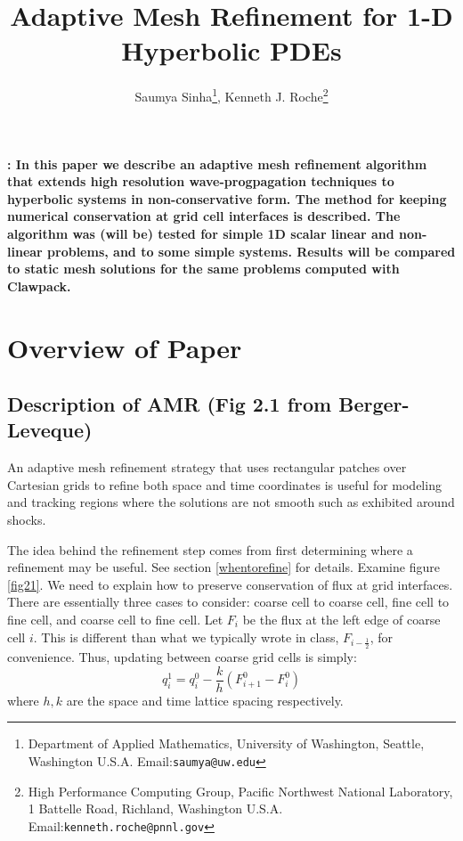 \documentclass[12pt,leqno]{article}
\begin{document}
\title{\bf Adaptive Mesh Refinement for 1-D Hyperbolic PDEs}
\author{ 
Saumya Sinha\footnote{Department of Applied Mathematics, University of Washington, Seattle, Washington
U.S.A.
Email:\texttt{saumya@uw.edu}},
Kenneth J. Roche\footnote{
High Performance Computing Group, 
Pacific Northwest National Laboratory,
1 Battelle Road,
Richland, Washington 
U.S.A. 
Email:\texttt{kenneth.roche@pnnl.gov}} 
}
\maketitle


{\bf \abstractname{: In this paper we describe an adaptive mesh refinement algorithm that extends high resolution wave-progpagation techniques to hyperbolic systems in non-conservative form. The method for keeping numerical conservation at grid cell interfaces is described. The algorithm was (will be) tested for simple 1D scalar linear and non-linear problems, and to some simple systems. Results will be compared to static mesh solutions for the same problems computed with Clawpack\cite{claw}.}} {\small}

\newpage
\tableofcontents
\listoffigures
\listoftables
\newpage

\section{Overview of Paper}
\subsection{Description of AMR (Fig 2.1 from Berger-Leveque)}
An adaptive mesh refinement strategy that uses rectangular patches over Cartesian grids to refine both space and time coordinates is useful for modeling and tracking regions where the solutions are not smooth such as exhibited around shocks. 

The idea behind the refinement step comes from first determining where a refinement may be useful. See section \ref{whentorefine} for details.  Examine figure \ref{fig21}.
We need to explain how to preserve conservation of flux at grid interfaces. There are essentially three cases to consider: coarse cell to coarse cell, fine cell to fine cell, and coarse cell to fine cell. Let $F_i$ be the flux at the left edge of coarse cell $i$. This is different than what we typically wrote in class, $F_{i-\frac{1}{2}}$, for convenience. Thus, updating between coarse grid cells is simply:
\begin{equation}
q_{i}^{1} = q_{i}^{0} - \frac{k}{h} (F_{i+1}^{0} - F_{i}^{0}) 
\end{equation}
\noindent where $h,k$ are the space and time lattice spacing respectively.
\end{document}
